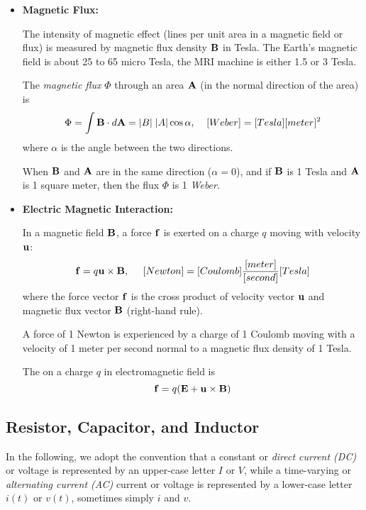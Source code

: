 \begin{itemize}
\begin{itemize}
\item {\bf Magnetic Flux:} 

  The intensity of magnetic effect (lines per unit area in a magnetic
  field or flux) is measured by magnetic flux density ${\bf B}$ in Tesla. 
  The Earth's magnetic field is about 25 to 65 micro Tesla, the MRI machine 
  is either 1.5 or 3 Tesla.

  The {\em magnetic flux} $\Phi$ through an area ${\bf A}$ (in the normal
  direction of the area) is
  \[
  \Phi=\int {\bf B} \cdot d{\bf A}=|B|\;|A| \cos\alpha,\;\;\;\;
            [Weber]=[Tesla] [meter]^2	
  \]   
  where $\alpha$ is the angle between the two directions. 
	
  When ${\bf B}$ and ${\bf A}$ are in the same direction ($\alpha=0$), 
  and if ${\bf B}$ is 1 Tesla and ${\bf A}$ is 1 square meter, then the
  flux $\Phi$ is 1 {\em Weber}.

\item {\bf Electric Magnetic Interaction:}

  In a magnetic field ${\bf B}$, a force ${\bf f}$ is exerted on a charge $q$ 
  moving with velocity ${\bf u}$:
  \[
  {\bf f}=q{\bf u} \times {\bf B},\;\;\;\;\;
      [Newton]=[Coulomb]\frac{[meter]}{[second]} [Tesla]	
  \]
  where the force vector ${\bf f}$ is the cross product of velocity vector 
  ${\bf u}$ and magnetic flux vector ${\bf B}$ (right-hand rule).

  A force of 1 Newton is experienced by a charge of 1 Coulomb moving with a 
  velocity of 1 meter per second normal to a magnetic flux density of 1 Tesla.


  The 
  on a charge $q$ in electromagnetic field is 
  \[
  {\bf f}=q({\bf E}+{\bf u}\times {\bf B}) 
  \]

\end{itemize}


\subsection*{Resistor, Capacitor, and Inductor}

In the following, we adopt the convention that a constant or 
{\em direct current (DC)} or voltage is represented by an upper-case letter 
$I$ or $V$, while a time-varying or {\em alternating current (AC)} current 
or voltage is represented by a lower-case letter $i(t)$ or $v(t)$, sometimes 
simply $i$ and $v$. 


\end{itemize}
